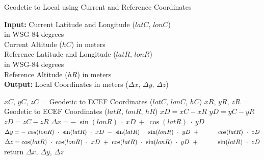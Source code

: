 {\begin{algorithm}[H]
\caption{Geodetic to Local using Current and Reference Coordinates}
\label{alg:localApp}
    \hspace*{\algorithmicindent} \textbf{Input:} Current Latitude and Longitude ($latC$, $lonC$)\\
        \hspace*{5em} in WSG-84 degrees\\
    \hspace*{4em} Current Altitude ($hC$) in meters\\
    \hspace*{4em} Reference Latitude and Longitude ($latR$, $lonR$)\\
        \hspace*{5em} in WSG-84 degrees\\
    \hspace*{4em} Reference Altitude ($hR$) in meters \\
    \hspace*{\algorithmicindent} \textbf{Output:} Local Coordinates in meters ($\Delta x$, $\Delta y$, $\Delta z$)
  \begin{algorithmic}[1]
    \STATE $xC$, $yC$, $zC$ = Geodetic to ECEF Coordinates ($latC$, $lonC$, $hC$)
    \STATE $xR$, $yR$, $zR$ = Geodetic to ECEF Coordinates ($latR$, $lonR$, $hR$)
    \STATE $xD = xC - xR$
    \STATE $yD = yC - yR$
    \STATE $zD = zC - zR$
    \STATE $\Delta x = -~\sin(lonR)~\cdot~xD~+~\cos(latR)~\cdot~yD$
    \STATE $\Delta y = -~cos(lonR)~\cdot~\sin(latR)~\cdot~xD~-~\sin(latR)~\cdot~\sin(lonR)~\cdot~yD~+ \hspace*{3em} \cos(latR)~\cdot~zD$
    \STATE $\Delta z = \cos(latR)~\cdot~\cos(lonR)~\cdot~xD~+~\cos(latR)~\cdot~\sin(lonR)~\cdot~yD~+  \hspace*{3em} \sin(latR)~\cdot~zD$
    \STATE return $\Delta x$, $\Delta y$, $\Delta z$
    \end{algorithmic}

\end{algorithm}


}
